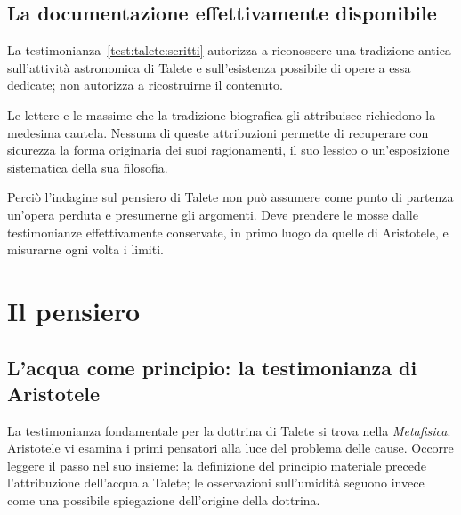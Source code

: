 \subsection{La documentazione effettivamente disponibile}

La testimonianza~\ref{test:talete:scritti} autorizza a riconoscere una tradizione antica sull'attività astronomica di Talete e sull'esistenza possibile di opere a essa dedicate; non autorizza a ricostruirne il contenuto.

Le lettere e le massime che la tradizione biografica gli attribuisce richiedono la medesima cautela. Nessuna di queste attribuzioni permette di recuperare con sicurezza la forma originaria dei suoi ragionamenti, il suo lessico o un'esposizione sistematica della sua filosofia.

Perciò l'indagine sul pensiero di Talete non può assumere come punto di partenza un'opera perduta e presumerne gli argomenti. Deve prendere le mosse dalle testimonianze effettivamente conservate, in primo luogo da quelle di Aristotele, e misurarne ogni volta i limiti.

\section{Il pensiero}

\subsection{L'acqua come principio: la testimonianza di Aristotele}

La testimonianza fondamentale per la dottrina di Talete si trova nella \emph{Metafisica}. Aristotele vi esamina i primi pensatori alla luce del problema delle cause. Occorre leggere il passo nel suo insieme: la definizione del principio materiale precede l'attribuzione dell'acqua a Talete; le osservazioni sull'umidità seguono invece come una possibile spiegazione dell'origine della dottrina.

